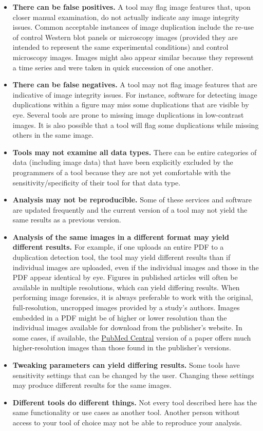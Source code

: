\documentclass[letterpaper, 12pt]{article}
\begin{document}
\begin{itemize}
    \setlength\itemsep{-0.5em}
    \item \textbf{There can be false positives.} A tool may flag image features that, upon closer manual examination, do not actually indicate any image integrity issues. Common acceptable instances of image duplication include the re-use of control Western blot panels or microscopy images (provided they are intended to represent the same experimental conditions) and control microscopy images. Images might also appear similar because they represent a time series and were taken in quick succession of one another.
    \item \textbf{There can be false negatives.} A tool may not flag image features that are indicative of image integrity issues. For instance, software for detecting image duplications within a figure may miss some duplications that are visible by eye. Several tools are prone to missing image duplications in low-contrast images. It is also possible that a tool will flag some duplications while missing others in the same image.
    \item \textbf{Tools may not examine all data types.} There can be entire categories of data (including image data) that have been explicitly excluded by the programmers of a tool because they are not yet comfortable with the sensitivity/specificity of their tool for that data type.
    \item \textbf{Analysis may not be reproducible.} Some of these services and software are updated frequently and the current version of a tool may not yield the same results as a previous version.
    \item \textbf{Analysis of the same images in a different format may yield different results.} For example, if one uploads an entire PDF to a duplication detection tool, the tool may yield different results than if individual images are uploaded, even if the individual images and those in the PDF appear identical by eye. Figures in published articles will often be available in multiple resolutions, which can yield differing results. When performing image forensics, it is always preferable to work with the original, full-resolution, uncropped images provided by a study's authors. Images embedded in a PDF might be of higher or lower resolution than the individual images available for download from the publisher’s website. In some cases, if available, the \href{https://pmc.ncbi.nlm.nih.gov/}{PubMed Central} version of a paper offers much higher-resolution images than those found in the publisher’s versions. 
    \item \textbf{Tweaking parameters can yield differing results.} Some tools have sensitivity settings that can be changed by the user. Changing these settings may produce different results for the same images.
    \item \textbf{Different tools do different things.} Not every tool described here has the same functionality or use cases as another tool. Another person without access to your tool of choice may not be able to reproduce your analysis.
\end{itemize}
\end{document}
